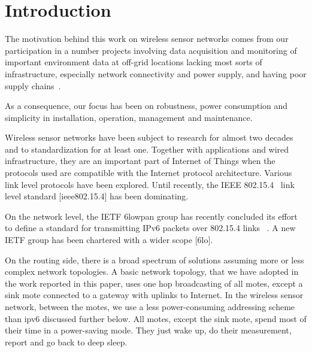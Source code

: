 \documentclass[conference, a4paper,10pt,twocolumn]{IEEEtran}
\begin{document}

%

\section{Introduction}
\label{sec:intro}
 
The motivation behind this work on wireless sensor networks comes from 
our participation in a number projects involving data acquisition and 
monitoring of important environment data at off-grid locations lacking 
most sorts of infrastructure, especially network connectivity and power 
supply, and having poor supply chains~\cite{UBIQUI}.

As a consequence, our focus has been on robustness, power consumption 
and simplicity in installation, operation, management and maintenance.

Wireless sensor networks have been subject to research for almost two 
decades and to standardization for at least one. Together with 
applications and wired infrastructure, they are an important part of 
Internet of Things when the protocols used are compatible with the 
Internet protocol architecture. Various link level protocols have been 
explored. Until recently, the IEEE 802.15.4~\cite{802154}  link level 
standard [ieee802.15.4] has been dominating.

On the network level, the IETF 6lowpan group has recently concluded its 
effort to define a standard for transmitting IPv6 packets over 802.15.4 
links ~\cite{6LOWPAN}. A new IETF group has been chartered with a wider scope 
[6lo].

On the routing side, there is a broad spectrum of solutions assuming 
more or less complex network topologies.  A basic network topology, that 
we have adopted in the work reported in this paper, uses one hop 
broadcasting of all motes, except a sink mote connected to a gateway 
with uplinks to Internet. In the wireless sensor network, between the 
motes, we use a less power-consuming addressing scheme than ipv6 
discussed further below. All motes, except the sink mote, spend most of 
their time in a power-saving mode. They just wake up, do their 
measurement, report and go back to deep sleep. 
\end{document}
